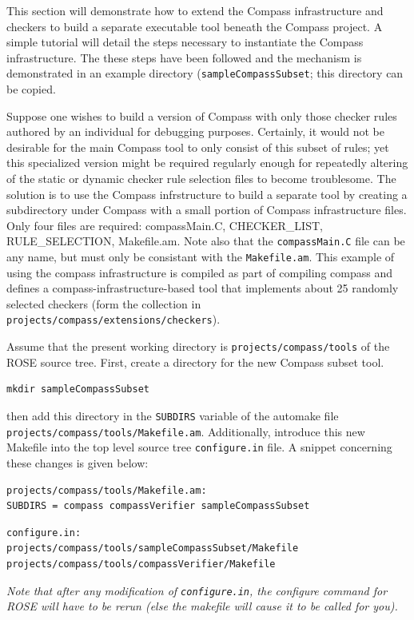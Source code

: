 This section will demonstrate how to extend the Compass
infrastructure and checkers to build a separate executable tool beneath
the Compass project. A simple tutorial will detail the steps necessary
to instantiate the Compass infrastructure. The these steps have been
followed and the mechanism is demonstrated in an example directory 
({\tt sampleCompassSubset}; this directory can be copied.

Suppose one wishes to build a version of Compass with only those checker rules
authored by an individual for debugging purposes. Certainly, it would not
be desirable for the main Compass tool to only consist of this subset of rules; yet
this specialized version might be required regularly enough for repeatedly altering
of the static or dynamic checker rule selection files to become troublesome.
The solution is to use the Compass infrstructure to build a separate tool
by creating a subdirectory under Compass with a small portion of Compass 
infrastructure files. Only four files are required: compassMain.C, CHECKER\_LIST,
RULE\_SELECTION, Makefile.am.  Note also that the {\tt compassMain.C} file
can be any name, but must only be consistant with the {\tt Makefile.am}. This
example of using the compass infrastructure is compiled as part of compiling
compass and defines a compass-infrastructure-based tool that implements
about 25 randomly selected checkers (form the collection in {\tt projects/compass/extensions/checkers}).

Assume that the present working directory is {\tt projects/compass/tools} 
of the ROSE source tree. First, create a directory for the new Compass 
subset tool.
%
\begin{verbatim}
mkdir sampleCompassSubset
\end{verbatim}
%
then add this directory in the {\tt SUBDIRS} variable of the automake file
{\tt projects/compass/tools/Makefile.am}. Additionally, introduce this new 
Makefile into the top level source tree {\tt configure.in} file. A snippet 
concerning these changes is given below:
%
\begin{verbatim}
projects/compass/tools/Makefile.am:
SUBDIRS = compass compassVerifier sampleCompassSubset
\end{verbatim}
%
\begin{verbatim}
configure.in:
projects/compass/tools/sampleCompassSubset/Makefile
projects/compass/tools/compassVerifier/Makefile
\end{verbatim}
%
{\it Note that after any modification of {\tt configure.in}, the configure command
for ROSE will have to be rerun (else the makefile will cause it to be called
for you).}

